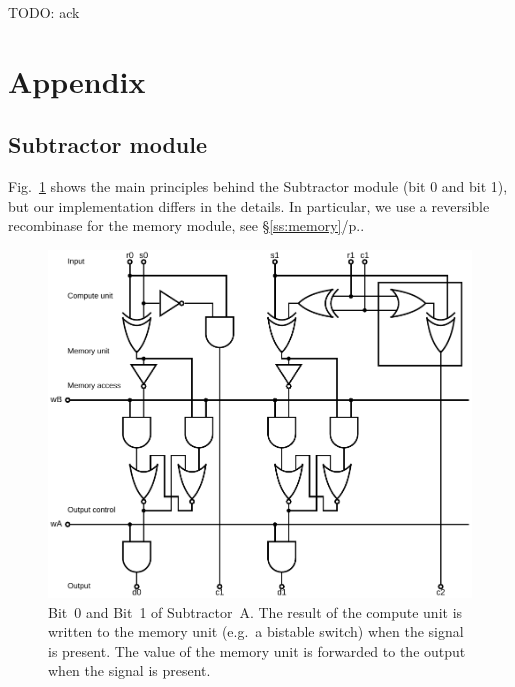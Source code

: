 \documentclass[12pt,notitlepage]{article}
\newcommand{\TODO}[1]{\textrm{\color{red}TODO: #1}}
\begin{document}
\TODO{ack}



\clearpage

\footnotesize


\normalsize

\clearpage


\section*{Appendix}

\subsection{Subtractor module}

Fig.~\ref{f:logical-subtractor01} 
shows the main principles
behind 
the Subtractor module (bit 0 and bit 1),
but our implementation
differs in the details.
%
In particular, we use a reversible recombinase
for the memory module, see \S\ref{ss:memory}/p.\pageref{ss:memory}.

\begin{figure}[phbt]
\centering
\includegraphics[width=0.9\linewidth]{circuits/Logical-HalfSubtractor0.svg.pdf}
%
\caption{%
Bit~0 and Bit~1
of
Subtractor~A.
%
The result of the compute unit is written to the memory unit
(e.g.~a bistable switch)
when the signal  is present.
%
The value of the memory unit is
forwarded to the output
when the signal  is present.
}
\label{f:logical-subtractor01}
\end{figure}
\end{document}
